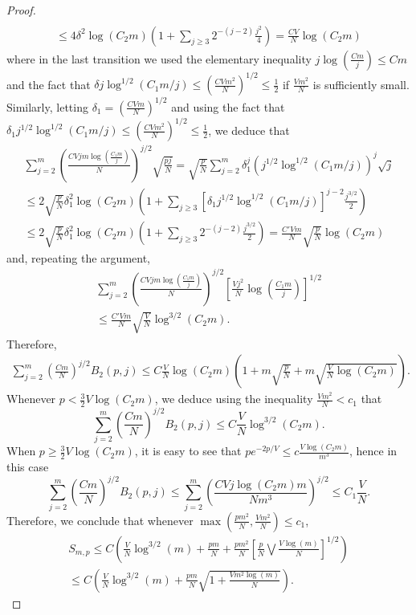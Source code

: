 \documentclass[12pt]{article}
\def\l{\left}
\def\r{\right}
\theoremstyle{thmstyletwo}%
\theoremstyle{thmstylethree}%
\begin{document}
\begin{proof}
\begin{multline*}
\\ 
\leq 4\delta^2 \log\l(C_2 m\r)\l( 1+ \sum_{j\geq 3} 2^{-(j-2)}\frac{j^2}{4}\r) = \frac{CV}{N} \log\l(C_2 m\r)
\end{multline*}
where in the last transition we used the elementary inequality $j\log\l(\frac{Cm}{j}\r)\leq Cm$ and the fact that $\delta j \log^{1/2}\l(C_1m/j\r) \leq \l(\frac{CVm^2}{N}\r)^{1/2}\leq \frac{1}{2}$ if $\frac{Vm^2}{N}$ is sufficiently small. 
Similarly, letting $\delta_1 = \l(\frac{CVm}{N} \r)^{1/2}$ and using the fact that $\delta_1 j^{1/2} \log^{1/2}\l(C_1m/j\r)\leq \l( \frac{CVm^2}{N}\r)^{1/2}\leq \frac 12$, we deduce that
\begin{multline*}
    \sum_{j=2}^m \l(\frac{CVjm\log\l( \frac{C_1m}{j} \r)}{N}\r)^{j/2}\sqrt{\frac{pj}{N}}
    =\sqrt{\frac{p}{N}}\sum_{j=2}^m \delta_1^j \l(j^{1/2}\log^{1/2}\l(C_1m/j\r)\r)^j \sqrt{j} 
    \\
    \leq 2\sqrt{\frac pN}\delta_1^2 \log(C_2m) \l(1 + \sum_{j\geq 3} \l[\delta_1 j^{1/2} \log^{1/2}\l(C_1m/j\r)\r]^{j-2}\frac{j^{3/2}}{2}\r)
    \\
    \leq 2\sqrt{\frac pN}\delta_1^2 \log(C_2m)\l( 1 + \sum_{j\geq 3} 2^{-(j-2)}\frac{j^{3/2}}{2}\r) = \frac{C'Vm}{N} \sqrt{\frac{p}{N}}\log(C_2m)
\end{multline*}
and, repeating the argument, 
\begin{multline*}
    \sum_{j=2}^m \l(\frac{CVjm\log\l( \frac{C_1m}{j} \r)}{N}\r)^{j/2}\l[\frac{Vj^2}{N}\log\l(\frac{C_1m}{j}\r)\r]^{1/2} 
    \\
    \leq \frac{C'Vm}{N}\sqrt{\frac{V}{N}}\log^{3/2}(C_2m).
\end{multline*}
Therefore, 
\begin{multline*}
    \sum_{j=2}^m \l(\frac{Cm}{N}\r)^{j/2} B_2(p,j) 
    \leq C\frac{V}{N}\log(C_2m)\l( 1+ m\sqrt{\frac{p}{N}} + m\sqrt{\frac{V}{N}\log(C_2m)}\r).
\end{multline*}
Whenever $p<\frac{3}{2}V\log(C_2m)$, we deduce using the inequality $\frac{Vm^2}{N}<c_1$ that 
\begin{equation}
\label{eq:B_2a}
\sum_{j=2}^m \l(\frac{Cm}{N}\r)^{j/2} B_2(p,j)\leq 
C\frac{V}{N}\log^{3/2}(C_2m).
\end{equation}
When $p\geq \frac{3}{2}V\log(C_2m)$, it is easy to see that $pe^{-2p/V}\leq c\frac{V\log(C_2m)}{m^3}$, hence in this case
\[
\sum_{j=2}^m \l(\frac{Cm}{N}\r)^{j/2} B_2(p,j)
\leq 
\sum_{j=2}^m \l(\frac{CV j \log(C_2 m)m}{Nm^3}\r)^{j/2} \leq C_1 \frac{V}{N}.
\]
Therefore, we conclude that whenever $\max\l( \frac{pm^2}{N},\frac{Vm^2}{N}\r)\leq c_1$, 
\begin{multline}
    \label{eq:S(m,p)}
S_{m,p}\leq C\l( \frac{V}{N}\log^{3/2}(m) +  \frac{pm}{N} + \frac{pm^2}{N} \l[\frac{p}{N}\bigvee \frac{V\log(m)}{N}\r]^{1/2}\r)
\\
\leq C\l( \frac{V}{N}\log^{3/2}(m) + \frac{pm}{N}\sqrt{1+\frac{Vm^2\log(m)}{N}}\r).
\end{multline}
\end{proof}
\end{document}
